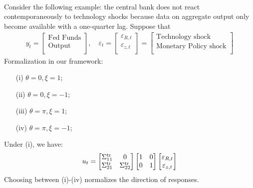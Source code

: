 \begin{eg}
    \

    Consider the following example: the central bank does not react contemporaneously to technology shocks
    because data on aggregate output only become available with a one-quarter lag.
    Suppose that
    \begin{gather*}
        y_t = \begin{bmatrix}
             \text{Fed Funds} \\
             \text{Output} \\
        \end{bmatrix}, \quad
        \varepsilon_t = \begin{bmatrix}
             \varepsilon_{R,t} \\
             \varepsilon_{z,t} \\
        \end{bmatrix}
        = \begin{bmatrix}
             \text{Technology shock} \\ 
             \text{Monetary Policy shock} \\
        \end{bmatrix}
    \end{gather*}
    Formalization in our framework:
    \begin{enumerate}
        \item[(i)] $\theta =0, \xi =1$;
        \item[(ii)] $\theta = 0, \xi =-1$;
        \item[(iii)] $\theta = \pi, \xi =1$;
        \item[(iv)] $\theta = \pi, \xi =-1$;
    \end{enumerate}
    Under (i), we have:
    \begin{gather*}
        u_t = \begin{bmatrix}
            \Sigma_{11}^{\operatorname{tr}}  &  0 \\
            \Sigma_{21}^{\operatorname{tr}} & \Sigma_{22}^{\operatorname{tr}} \\
        \end{bmatrix}
        \begin{bmatrix}
            1 &  0 \\
            0 &  1 \\
        \end{bmatrix}
        \begin{bmatrix}
             \varepsilon_{R,t} \\
             \varepsilon_{z,t} \\
        \end{bmatrix}
    \end{gather*}
    Choosing between (i)-(iv) normalizes the direction of responses.
\end{eg}

